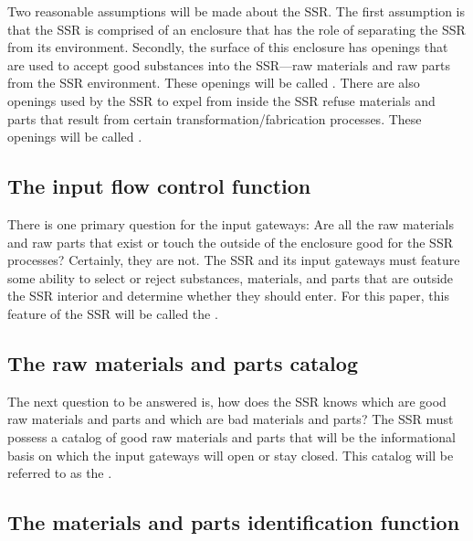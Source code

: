 Two reasonable assumptions will be made about the SSR. The first assumption is
that the SSR is
comprised of an enclosure that has the role of separating the SSR from its
environment. Secondly, the surface of this enclosure has
openings that are used to accept good
substances into the SSR---raw materials and raw parts from the SSR environment. 
These openings will be called . There are also
openings used by the SSR to expel from inside the SSR refuse materials
and parts that result from certain transformation/fabrication processes.
These openings will be called .

\subsection[The input flow control function]{The input flow control
function}

There is one primary question
for the input gateways: Are all the raw materials and raw parts that
exist or touch the outside of the enclosure good for the SSR processes?
Certainly, they are not. The SSR and its input gateways must feature some
ability to select or reject substances, materials,
and parts that are outside the SSR interior and determine whether they should enter. 
For this paper, this feature of the SSR will be called the .

\subsection[The raw materials and parts catalog]{The raw materials and
parts catalog}

The next question to be answered
is, how does the SSR knows which are good raw materials and parts
and which are bad materials and parts? The SSR must
possess a catalog of good raw materials and parts that will be the
informational basis on which the input gateways will open or stay
closed. This catalog will be referred to as the .

\subsection[The materials and parts identification function]{The
materials and parts identification function}

